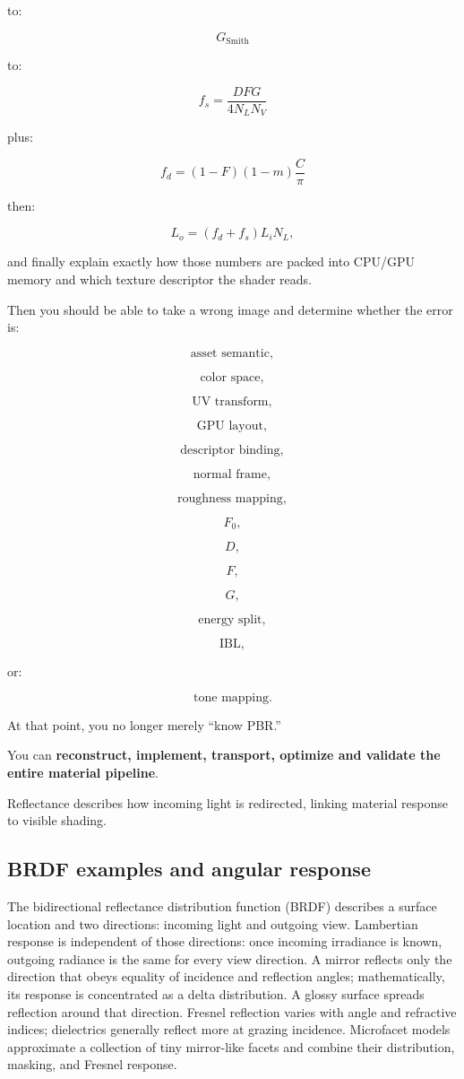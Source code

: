to:

\[
G_{\mathrm{Smith}}
\]

to:

\[
f_s=
\frac{DFG}{4N_LN_V}
\]

plus:

\[
f_d=
(1-F)(1-m)\frac{C}{\pi}
\]

then:

\[
L_o=
(f_d+f_s)L_iN_L,
\]

and finally explain exactly how those numbers are packed into CPU/GPU memory and which texture descriptor the shader reads.

Then you should be able to take a wrong image and determine whether the error is:

\[
\text{asset semantic},
\]

\[
\text{color space},
\]

\[
\text{UV transform},
\]

\[
\text{GPU layout},
\]

\[
\text{descriptor binding},
\]

\[
\text{normal frame},
\]

\[
\text{roughness mapping},
\]

\[
F_0,
\]

\[
D,
\]

\[
F,
\]

\[
G,
\]

\[
\text{energy split},
\]

\[
\text{IBL},
\]

or:

\[
\text{tone mapping}.
\]

At that point, you no longer merely ``know PBR.''

You can \textbf{reconstruct, implement, transport, optimize and validate the entire material pipeline}.

Reflectance describes how incoming light is redirected, linking material response to visible shading.

\subsection{BRDF examples and angular response}\label{03-visual-computing-i-ch006-brdf-examples-and-angular-response}

\hypertarget{03-visual-computing-i-ch006-brdf-examples-and-angular-response}{}

The bidirectional reflectance distribution function (BRDF) describes a surface location and two directions: incoming light and outgoing view. Lambertian response is independent of those directions: once incoming irradiance is known, outgoing radiance is the same for every view direction. A mirror reflects only the direction that obeys equality of incidence and reflection angles; mathematically, its response is concentrated as a delta distribution. A glossy surface spreads reflection around that direction. Fresnel reflection varies with angle and refractive indices; dielectrics generally reflect more at grazing incidence. Microfacet models approximate a collection of tiny mirror-like facets and combine their distribution, masking, and Fresnel response.

